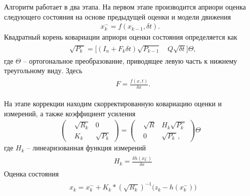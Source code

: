 \documentclass[a4paper,12pt]{article}
\begin{document}
Алгоритм работает в два этапа. На первом этапе производится априори оценка следующего состояния на основе предыдущей оценки и модели движения
\begin{align}
x_k^- = f(x_{k-1}, \delta t).
\end{align} 
Квадратный корень ковариации априори оценки состояния определяется как
\begin{align}
\begin{split}
&\sqrt{P^-_k} = \Big[ (I_n +  F_k \delta t) \sqrt{P_{k-1}} \quad Q \sqrt{\delta t}  \Big] \Theta,
\end{split}
\end{align}
где $\Theta$ -- ортогональное преобразование, приводящее левую часть к нижнему треугольному виду. Здесь
\begin{align}
\begin{split}
&F = \frac{f(x,t)}{\delta x}.
\end{split}
\end{align}

На этапе коррекции находим скорректированную ковариацию оценки и измерений, а также коэффициент усиления
\begin{align}
\begin{pmatrix}
&\sqrt{R_k} &0 \\
&K_k &\sqrt{P_k}
\end{pmatrix}
=
\begin{pmatrix}
&\sqrt{R} &H_k \sqrt{P_k^-} \\
&0 &\sqrt{P_k^-},
\end{pmatrix} \Theta
\end{align}
где $H_k$ -- линеаризованная функция измерений  
\begin{align}
\begin{split}
&H_k = \frac{\delta h(x_k^-)}{\delta x}
\end{split}
\end{align}
Оценка состояния
\begin{align}
\begin{split}
&x_k = x_k^- + K_k * (\sqrt{R_k})^{-1} \big(z_k - h(x_k^-)\big)
\end{split}
\end{align}
\end{document}
